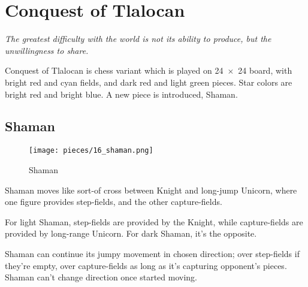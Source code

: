 

\chapter*{Conquest of Tlalocan}
\label{ch:Conquest of Tlalocan}

\begin{flushright}
\parbox{0.78\textwidth}{
\emph{The greatest difficulty with the world is not its ability to produce, but the unwillingness to share.\newline
{} } }
\end{flushright}

\noindent
Conquest of Tlalocan is chess variant which is played on 24~$\times$~24
board, with bright red and cyan fields, and dark red and light green
pieces. Star colors are bright red and bright blue.
A new piece is introduced, Shaman.

\clearpage %

\section*{Shaman}
\label{sec:Conquest of Tlalocan/Shaman}

\vspace*{-0.7\baselineskip}
\noindent
\begin{wrapfigure}[10]{l}{0.4\textwidth}
\centering
\texttt{[image: pieces/16\_shaman.png]}
\vspace*{-1.4\baselineskip}
\caption{Shaman}
\label{fig:16_shaman}
\end{wrapfigure}
Shaman moves like sort-of cross between Knight and long-jump Unicorn,
where one figure provides step-fields, and the other capture-fields.

For light Shaman, step-fields are provided by the Knight, while capture-fields
are provided by long-range Unicorn. For dark Shaman, it's the opposite.

Shaman can continue its jumpy movement in chosen direction; over step-fields
if they're empty, over capture-fields as long as it's capturing opponent's
pieces. Shaman can't change direction once started moving.

